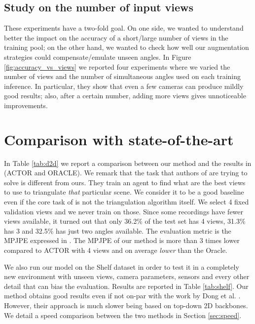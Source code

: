\documentclass[a4paper,conference]{IEEEtran}
\begin{document}
\subsection{Study on the number of input views} 
These experiments have a two-fold goal. On one side, we wanted to understand better the impact on the accuracy of a short/large number of views in the training pool; on the other hand, we wanted to check how well our augmentation strategies could compensate/emulate unseen angles. In Figure \ref{fig:accuracy_vs_views} we reported four experiments where we varied the number of views and the number of simultaneous angles used on each training inference. In particular, they show that even a few cameras can produce mildly good results; also, after a certain number, adding more views gives unnoticeable improvements.

\section{Comparison with state-of-the-art}
In Table \ref{tab:d2d} we report a comparison between our method and the results in \cite{pirinen2019domes} (ACTOR and ORACLE). We remark that the task that authors of \cite{pirinen2019domes} are trying to solve is different from ours. They train an agent to find what are the best views to use to triangulate \emph{that} particular scene. We consider it to be a good baseline even if the core task of \cite{pirinen2019domes} is not the triangulation algorithm itself.
We select 4 fixed validation views and we never train on those. Since some recordings have fewer views available, it turned out that only 36.2\% of the test set has 4 views, 31.3\% has 3 and 32.5\% has just two angles available.
The evaluation metric is the MPJPE expressed in . The MPJPE of our method is more than 3 times lower compared to ACTOR with 4 views and on average \emph{lower} than the Oracle. 

We also run our model on the Shelf dataset in order to test it in a completely new environment with unseen views, camera parameters, sensors and every other detail that can bias the evaluation. Results are reported in Table \ref{tab:shelf}. Our method obtains good results even if not on-par with the work by Dong et al. \cite{dong2019fast}. However, their approach is much slower being based on top-down 2D backbones. We detail a speed comparison between the two methods in Section \ref{sec:speed}.
\end{document}
